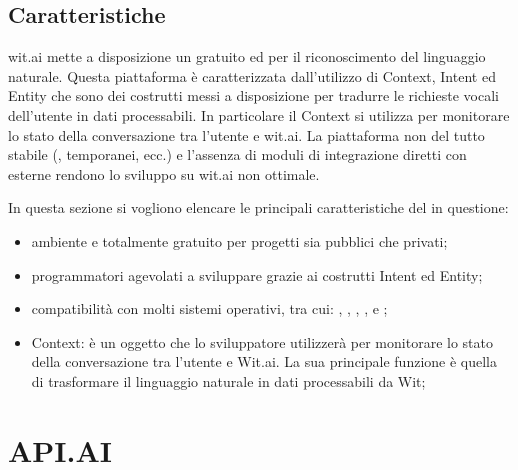 \documentclass[a4paper,titlepage]{article}
\begin{document}
		\subsection{Caratteristiche}

			wit.ai mette a disposizione un  gratuito ed  per il riconoscimento del linguaggio naturale. Questa piattaforma è caratterizzata dall'utilizzo di Context, Intent ed Entity che sono dei costrutti messi a disposizione per tradurre le richieste vocali dell'utente in dati processabili. In particolare il Context si utilizza per monitorare lo stato della conversazione tra l'utente e wit.ai.
			La piattaforma non del tutto stabile (,  temporanei, ecc.) e l'assenza di moduli di integrazione diretti con  esterne rendono lo sviluppo su wit.ai non ottimale.

In questa sezione si vogliono elencare le principali caratteristiche del  in questione:
\begin{itemize}
	\item ambiente  e totalmente gratuito per progetti sia pubblici che privati;
	\item programmatori agevolati a sviluppare grazie ai costrutti Intent ed Entity; 
	\item compatibilità con molti sistemi operativi, tra cui: , , , ,  e ;
	\item Context: è un oggetto che lo sviluppatore utilizzerà per monitorare lo stato della conversazione tra l'utente e Wit.ai. La sua principale funzione è quella di trasformare il linguaggio naturale in dati processabili da Wit;	
\end{itemize}
		
\newpage
\section{API.AI}
\end{document}
